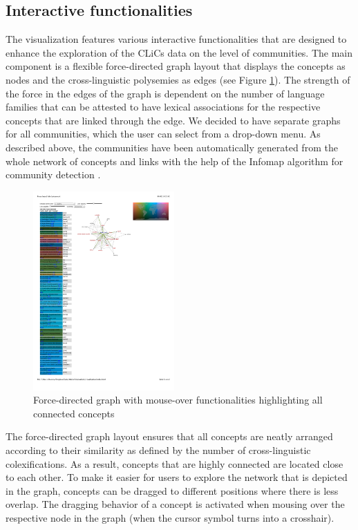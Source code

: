 \subsection{Interactive functionalities}



The visualization features various interactive functionalities that are designed to enhance the exploration of the CLiCs data on the level of communities. The main component is a flexible force-directed graph layout that displays the concepts as nodes and the cross-linguistic polysemies as edges (see Figure \ref{EarthLand}). The strength of the force in the edges of the graph is dependent on the number of language families that can be attested to have lexical associations for the respective concepts that are linked through the edge. We decided to have separate graphs for all communities, which the user can select from a drop-down menu. As described above, the communities have been automatically generated from the whole network of concepts and links with the help of the Infomap algorithm for community detection \cite{Rosvall2008}. 

\begin{figure}[htbp]
\begin{center}
\includegraphics[width=0.48\textwidth]{img/countryconnections}
\caption{Force-directed graph with mouse-over functionalities highlighting all connected concepts}
\label{EarthLand}
\end{center}
\end{figure}

The force-directed graph layout ensures that all concepts are neatly arranged according to their similarity as defined by the number of cross-linguistic colexifications. As a result, concepts that are highly connected are located close to each other.  To make it easier for users to explore the network that is depicted in the graph, concepts can be dragged to different positions where there is less overlap. The dragging behavior of a concept  is activated when mousing over the respective node in the graph (when the cursor symbol turns into a crosshair).

